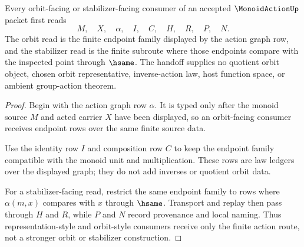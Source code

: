 \begin{theorem}
\label{thm:monoid-action-orbit-stabilizer-handoff}
Every orbit-facing or stabilizer-facing consumer of an accepted $\MonoidActionUp$ packet first reads
$$
M,\quad X,\quad \alpha,\quad I,\quad C,\quad H,\quad R,\quad P,\quad N .
$$
The orbit read is the finite endpoint family displayed by the action graph row, and the stabilizer read is the finite subroute where those endpoints compare with the inspected point through $\hsame$. The handoff supplies no quotient orbit object, chosen orbit representative, inverse-action law, host function space, or ambient group-action theorem.
\end{theorem}
\begin{proof}
Begin with the action graph row $\alpha$. It is typed only after the monoid source $M$ and acted carrier $X$ have been displayed, so an orbit-facing consumer receives endpoint rows over the same finite source data.

Use the identity row $I$ and composition row $C$ to keep the endpoint family compatible with the monoid unit and multiplication. These rows are law ledgers over the displayed graph; they do not add inverses or quotient orbit data.

For a stabilizer-facing read, restrict the same endpoint family to rows where $\alpha(m,x)$ compares with $x$ through $\hsame$. Transport and replay then pass through $H$ and $R$, while $P$ and $N$ record provenance and local naming. Thus representation-style and orbit-style consumers receive only the finite action route, not a stronger orbit or stabilizer construction.
\end{proof}



